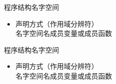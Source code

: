 \begin{frame}[fragile]{程序结构}{名字空间}
  \begin{itemize}
  \item 声明方式（作用域分辨符）\\
    名字空间名\cppinline{::}成员变量或成员函数\\
    \begin{center}
      \begin{minipage}{0.45\linewidth}
      \end{minipage}\qquad
      \begin{minipage}{0.45\linewidth}
      \end{minipage}
    \end{center}    
  \end{itemize}
\end{frame}

\begin{frame}[fragile]{程序结构}{名字空间}
  \begin{itemize}
  \item 声明方式（作用域分辨符） \\
    名字空间名\cppinline{::}成员变量或成员函数 \\
    \begin{center}
      \begin{minipage}{0.45\linewidth}
      \end{minipage}\qquad
      \begin{minipage}{0.45\linewidth}
      \end{minipage}
    \end{center}    
  \end{itemize}
\end{frame}

